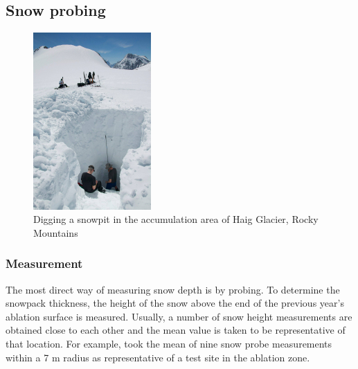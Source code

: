 \documentclass{sfuthesis}
\begin{document}
\subsection{Snow probing}
\label{snowprobing}
\begin{figure}
 \centering
      \includegraphics[width=0.4\textwidth]{snowpit.jpg}
  \caption{Digging a snowpit in the accumulation area of Haig Glacier, Rocky Mountains}
        \label{snowpit}
\end{figure}

\subsubsection{Measurement}
The most direct way of measuring snow depth is by probing. To determine the snowpack thickness, the height of the snow above the end of the previous year's ablation surface is measured. Usually, a number of snow height measurements are obtained close to each other and the mean value is taken to be representative of that location. For example, \cite{Machguth2006} took the mean of nine snow probe measurements within a 7 m radius as representative of a test site in the ablation zone.  
\end{document}
